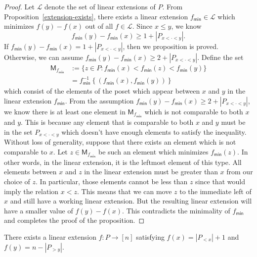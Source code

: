 \documentclass{puthesis-UG}
\begin{document}
\begin{proof}
    Let $\mathscr{L}$ denote the set of linear extensions of $P$. From Proposition~\ref{extension-exists}, there exists a linear extension $f_{\mathsf{min}} \in \mathscr{L}$ which minimizes $f (y) - f(x)$ out of all $f \in \mathscr{L}$. Since $x \leq y$, we know 
    \[
        f_{\mathsf{min}}(y) - f_{\mathsf{min}}(x) \geq 1 + |P_{x < \cdot < y}|.
    \]
    If $f_{\mathsf{min}}(y) - f_{\mathsf{min}}(x) = 1 + |P_{x < \cdot < y}|$, then we proposition is proved. Otherwise, we can assume $f_{\mathsf{min}}(y) - f_{\mathsf{min}}(x) \geq 2 + |P_{x < \cdot < y}|$. Define the set
    \begin{align*}
        \mathsf{M}_{f_{\mathsf{min}}} & := \{z \in P : f_{\mathsf{min}} (x) < f_{\mathsf{min}}(z) < f_{\mathsf{min}}(y) \} \\
        & = f_{\mathsf{min}}^{-1} \left \{ ( f_{\mathsf{min}} (x) , f_{\mathsf{min}} (y) ) \right \}
    \end{align*}
    which consist of the elements of the poset which appear between $x$ and $y$ in the linear extension $f_{\mathsf{min}}$. From the assumption $f_{\mathsf{min}}(y) - f_{\mathsf{min}}(x) \geq 2 + |P_{x < \cdot < y}|$, we know there is at least one element in $\mathsf{M}_{f_{\mathsf{min}}}$ which is not comparable to both $x$ and $y$. This is because any element that is comparable to both $x$ and $y$ must be in the set $P_{x < \cdot < y}$ which doesn't have enough elements to satisfy the inequality. Without loss of generality, suppose that there exists an element which is not comparable to $x$. Let $z \in \mathsf{M}_{f_{\mathsf{min}}}$ be such an element which minimizes $f_{\mathsf{min}}(z)$. In other words, in the linear extension, it is the leftmost element of this type. All elements between $x$ and $z$ in the linear extension must be greater than $x$ from our choice of $z$. In particular, those elements cannot be less than $z$ since that would imply the relation $x < z$. This means that we can move $z$ to the immediate left of $x$ and still have a working linear extension. But the resulting linear extension will have a smaller value of $f(y) - f(x)$. This contradicts the minimality of $f_{\mathsf{min}}$ and completes the proof of the proposition.
\end{proof}

\begin{prop} \label{extension-wide-exists}
    There exists a linear extension $f : P \to [n]$ satisfying $f(x) = |P_{< x}| + 1$ and $f(y) = n - |P_{> y}|$. 
\end{prop}
\end{document}
